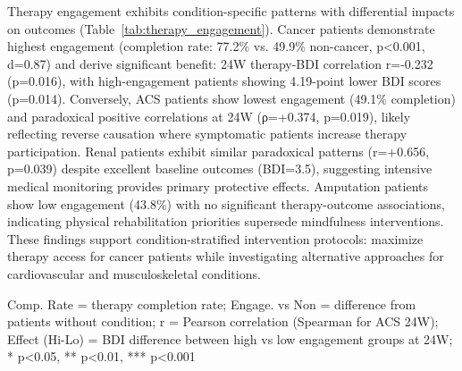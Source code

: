 \documentclass[conference]{IEEEtran}
\begin{document}
Therapy engagement exhibits condition-specific patterns with differential impacts on outcomes (Table~\ref{tab:therapy_engagement}). Cancer patients demonstrate highest engagement (completion rate: 77.2\% vs. 49.9\% non-cancer, p<0.001, d=0.87) and derive significant benefit: 24W therapy-BDI correlation r=-0.232 (p=0.016), with high-engagement patients showing 4.19-point lower BDI scores (p=0.014). Conversely, ACS patients show lowest engagement (49.1\% completion) and paradoxical positive correlations at 24W (ρ=+0.374, p=0.019), likely reflecting reverse causation where symptomatic patients increase therapy participation. Renal patients exhibit similar paradoxical patterns (r=+0.656, p=0.039) despite excellent baseline outcomes (BDI=3.5), suggesting intensive medical monitoring provides primary protective effects. Amputation patients show low engagement (43.8\%) with no significant therapy-outcome associations, indicating physical rehabilitation priorities supersede mindfulness interventions. These findings support condition-stratified intervention protocols: maximize therapy access for cancer patients while investigating alternative approaches for cardiovascular and musculoskeletal conditions.

\begin{table}[h]
\centering
\caption{Therapy Engagement and Depression Outcomes by Medical Condition}
\label{tab:therapy_engagement}
\begin{tablenotes}
\footnotesize
\item Comp. Rate = therapy completion rate; Engage. vs Non = difference from patients without condition; r = Pearson correlation (Spearman for ACS 24W); Effect (Hi-Lo) = BDI difference between high vs low engagement groups at 24W; * p<0.05, ** p<0.01, *** p<0.001
\end{tablenotes}
\end{table}
\end{document}
